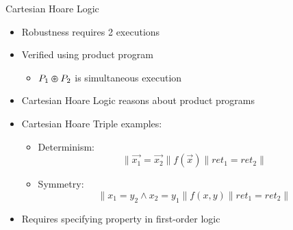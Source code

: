 \documentclass[usenames,dvipsnames]{beamer}
\begin{document}
\begin{frame}{Cartesian Hoare Logic}
    \begin{itemize}
        \item<1-> Robustness requires 2 executions
        \item<2-> Verified using product program
            \begin{itemize}
                \item<3-> \(P_{1} \varoast P_{2}\) is simultaneous execution
            \end{itemize}
        \item<4-> Cartesian Hoare Logic reasons about product programs
        \item<5-> Cartesian Hoare Triple examples:
            \begin{itemize}
                \item<6-> Determinism: \[\|\vec{x_{1}} = \vec{x_{2}}\|f(\vec{x})\|ret_{1} = ret_{2}\|\]
                \item<7-> Symmetry: \[\|x_{1} = y_{2} \wedge x_{2} = y_{1}\|f(x,y)\|ret_{1} = ret_{2}\|\]
            \end{itemize}
        \item<8-> Requires specifying property in first-order logic
    \end{itemize}
\end{frame}

\end{document}

